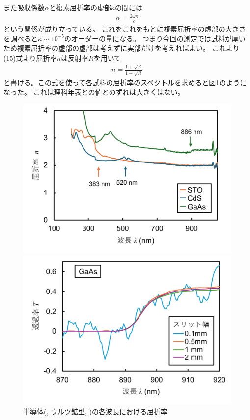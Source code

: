 \documentclass[11pt,dvipdfmx,a4paper]{jsarticle}
\begin{document}
また吸収係数\(\alpha\)と複素屈折率の虚部\(\kappa\)の間には
\begin{align}
    \alpha = \frac{2\omega \kappa}{c}
\end{align}
という関係が成り立っている。
これをこれをもとに複素屈折率の虚部の大きさを調べると\(\kappa\sim 10^{-5}\)のオーダーの量になる。
つまり今回の測定では試料が厚いため複素屈折率の虚部の虚部は考えずに実部だけを考えればよい。
これより(15)式より屈折率\(n\)は反射率\(R\)を用いて
\begin{align}
    n = \frac{1 + \sqrt{R}}{1 - \sqrt{R}}
\end{align}
と書ける。この式を使って各試料の屈折率のスペクトルを求めると図\ref{graph:04}のようになった。
これは理科年表\cite{rikanenpyo}との値とのずれは大きくはない。
\begin{figure}[H]
    \centering
    \begin{minipage}[t]{0.48\columnwidth}
        \centering
        \includegraphics[width = \columnwidth]{graph/graph4.png}
        \caption{半導体(, ウルツ鉱型, )の各波長における屈折率}
        \label{graph:04}
    \end{minipage}
    \hfil
    \begin{minipage}[t]{0.48\columnwidth}
        \centering
        \includegraphics[width = \columnwidth]{graph/graph6.png}

\end{minipage}
\end{figure}
\end{document}
